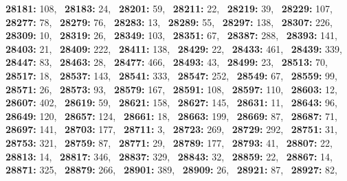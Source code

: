 \textbf{28181:} 108,\allowbreak~ 
\textbf{28183:} 24,\allowbreak~ 
\textbf{28201:} 59,\allowbreak~ 
\textbf{28211:} 22,\allowbreak~ 
\textbf{28219:} 39,\allowbreak~ 
\textbf{28229:} 107,\allowbreak~ 
\textbf{28277:} 78,\allowbreak~ 
\textbf{28279:} 76,\allowbreak~ 
\textbf{28283:} 13,\allowbreak~ 
\textbf{28289:} 55,\allowbreak~ 
\textbf{28297:} 138,\allowbreak~ 
\textbf{28307:} 226,\allowbreak~ 
\textbf{28309:} 10,\allowbreak~ 
\textbf{28319:} 26,\allowbreak~ 
\textbf{28349:} 103,\allowbreak~ 
\textbf{28351:} 67,\allowbreak~ 
\textbf{28387:} 288,\allowbreak~ 
\textbf{28393:} 141,\allowbreak~ 
\textbf{28403:} 21,\allowbreak~ 
\textbf{28409:} 222,\allowbreak~ 
\textbf{28411:} 138,\allowbreak~ 
\textbf{28429:} 22,\allowbreak~ 
\textbf{28433:} 461,\allowbreak~ 
\textbf{28439:} 339,\allowbreak~ 
\textbf{28447:} 83,\allowbreak~ 
\textbf{28463:} 28,\allowbreak~ 
\textbf{28477:} 466,\allowbreak~ 
\textbf{28493:} 43,\allowbreak~ 
\textbf{28499:} 23,\allowbreak~ 
\textbf{28513:} 70,\allowbreak~ 
\textbf{28517:} 18,\allowbreak~ 
\textbf{28537:} 143,\allowbreak~ 
\textbf{28541:} 333,\allowbreak~ 
\textbf{28547:} 252,\allowbreak~ 
\textbf{28549:} 67,\allowbreak~ 
\textbf{28559:} 99,\allowbreak~ 
\textbf{28571:} 26,\allowbreak~ 
\textbf{28573:} 93,\allowbreak~ 
\textbf{28579:} 167,\allowbreak~ 
\textbf{28591:} 108,\allowbreak~ 
\textbf{28597:} 110,\allowbreak~ 
\textbf{28603:} 12,\allowbreak~ 
\textbf{28607:} 402,\allowbreak~ 
\textbf{28619:} 59,\allowbreak~ 
\textbf{28621:} 158,\allowbreak~ 
\textbf{28627:} 145,\allowbreak~ 
\textbf{28631:} 11,\allowbreak~ 
\textbf{28643:} 96,\allowbreak~ 
\textbf{28649:} 120,\allowbreak~ 
\textbf{28657:} 124,\allowbreak~ 
\textbf{28661:} 18,\allowbreak~ 
\textbf{28663:} 199,\allowbreak~ 
\textbf{28669:} 87,\allowbreak~ 
\textbf{28687:} 71,\allowbreak~ 
\textbf{28697:} 141,\allowbreak~ 
\textbf{28703:} 177,\allowbreak~ 
\textbf{28711:} 3,\allowbreak~ 
\textbf{28723:} 269,\allowbreak~ 
\textbf{28729:} 292,\allowbreak~ 
\textbf{28751:} 31,\allowbreak~ 
\textbf{28753:} 321,\allowbreak~ 
\textbf{28759:} 87,\allowbreak~ 
\textbf{28771:} 29,\allowbreak~ 
\textbf{28789:} 177,\allowbreak~ 
\textbf{28793:} 41,\allowbreak~ 
\textbf{28807:} 22,\allowbreak~ 
\textbf{28813:} 14,\allowbreak~ 
\textbf{28817:} 346,\allowbreak~ 
\textbf{28837:} 329,\allowbreak~ 
\textbf{28843:} 32,\allowbreak~ 
\textbf{28859:} 22,\allowbreak~ 
\textbf{28867:} 14,\allowbreak~ 
\textbf{28871:} 325,\allowbreak~ 
\textbf{28879:} 266,\allowbreak~ 
\textbf{28901:} 389,\allowbreak~ 
\textbf{28909:} 26,\allowbreak~ 
\textbf{28921:} 87,\allowbreak~ 
\textbf{28927:} 82,\allowbreak~ 
